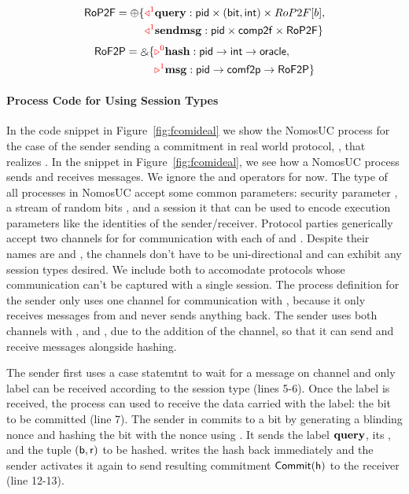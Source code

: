 \begin{align*}
    \mathsf{RoP2F} = \oplus \{ &\textcolor{red}{\triangleleft^1} \mathbf{query}: \mathsf{pid} \times (\mathsf{bit},\mathsf{int}) \times RoP2F[b], \\
    &\textcolor{red}{\triangleleft^{1}} \mathbf{sendmsg}: \mathsf{pid} \times \mathsf{comp2f} \times \mathsf{RoP2F} \}
\end{align*}
\begin{align*}
    \mathsf{RoF2P} = \mathbin{\binampersand} \{ &\textcolor{red}{\triangleright^{0}} \mathbf{hash}: \mathsf{pid} \rightarrow \mathsf{int} \rightarrow \mathsf{oracle}, \\
    &\textcolor{red}{\triangleright^{1}} \mathbf{msg}: \mathsf{pid} \rightarrow \mathsf{comf2p} \rightarrow \mathsf{RoF2P} \}
\end{align*}

\paragraph{Process Code for Using Session Types}
In the code snippet in Figure~\ref{fig:fcomideal} we show the NomosUC process for the case of the sender sending a commitment in real world protocol, \protcom, that realizes \Fcom.
In the \protcom snippet in Figure~\ref{fig:fcomideal}, we see how a NomosUC process sends and receives messages. We ignore the \ipay and \iget operators for now.
The type of all processes in NomosUC accept some common parameters: security parameter , a stream of random bits , and a session it  that can be used to encode execution parameters like the identities of the sender/receiver.
Protocol parties generically accept two channels for for communication with each of \F and \Z. 
Despite their names are  and , the channels don't have to be uni-directional and can exhibit any session types desired. We include both to accomodate protocols whose communication can't be captured with a single session.
The process definition for the sender only uses one channel for communication with \Z, because it only receives messages from \Z and never sends anything back.
The sender uses both channels with \Fro,  and , due to the addition of the channel, so that it can send and receive messages alongside hashing. 

The sender first uses a case statemtnt to wait for a message on channel  and only label  can be received according to the session type (lines 5-6).
Once the label is received, the process can used \inline{$\nrecv$} to receive the data carried with the label: the bit to be committed (line 7). 
The sender in \protcom commits to a bit by generating a blinding nonce and hashing the bit with the nonce using \Fro.
It sends the label $\mathbf{query}$, its , and the tuple $\mathsf{(b,r)}$ to be hashed.
\Fro writes the hash back immediately and the sender activates it again to send resulting commitment $\mathsf{Commit(h)}$ to the receiver (line 12-13).

